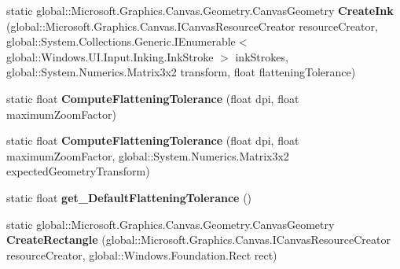 \begin{DoxyCompactItemize}
\item 
\mbox{\label{class_microsoft_1_1_graphics_1_1_canvas_1_1_geometry_1_1_canvas_geometry_a2ab66ac5c29e306f56d21b3368d42415}} 
static global\+::\+Microsoft.\+Graphics.\+Canvas.\+Geometry.\+Canvas\+Geometry {\bfseries Create\+Ink} (global\+::\+Microsoft.\+Graphics.\+Canvas.\+I\+Canvas\+Resource\+Creator resource\+Creator, global\+::\+System.\+Collections.\+Generic.\+I\+Enumerable$<$ global\+::\+Windows.\+U\+I.\+Input.\+Inking.\+Ink\+Stroke $>$ ink\+Strokes, global\+::\+System.\+Numerics.\+Matrix3x2 transform, float flattening\+Tolerance)
\item 
\mbox{\label{class_microsoft_1_1_graphics_1_1_canvas_1_1_geometry_1_1_canvas_geometry_af0a58e1e6450e34081143a65770bb043}} 
static float {\bfseries Compute\+Flattening\+Tolerance} (float dpi, float maximum\+Zoom\+Factor)
\item 
\mbox{\label{class_microsoft_1_1_graphics_1_1_canvas_1_1_geometry_1_1_canvas_geometry_a4cab7234385475a4109d2dcdca24ca39}} 
static float {\bfseries Compute\+Flattening\+Tolerance} (float dpi, float maximum\+Zoom\+Factor, global\+::\+System.\+Numerics.\+Matrix3x2 expected\+Geometry\+Transform)
\item 
\mbox{\label{class_microsoft_1_1_graphics_1_1_canvas_1_1_geometry_1_1_canvas_geometry_aec4a5123b972fd4576fdd3ab85f59718}} 
static float {\bfseries get\+\_\+\+Default\+Flattening\+Tolerance} ()
\item 
\mbox{\label{class_microsoft_1_1_graphics_1_1_canvas_1_1_geometry_1_1_canvas_geometry_a660756502ddaec1e43624023d23a5c60}} 
static global\+::\+Microsoft.\+Graphics.\+Canvas.\+Geometry.\+Canvas\+Geometry {\bfseries Create\+Rectangle} (global\+::\+Microsoft.\+Graphics.\+Canvas.\+I\+Canvas\+Resource\+Creator resource\+Creator, global\+::\+Windows.\+Foundation.\+Rect rect)
\item 
\mbox{\label{class_microsoft_1_1_graphics_1_1_canvas_1_1_geometry_1_1_canvas_geometry_a09f20f98661ef071c60ef36ee6e9c383}} 

\end{DoxyCompactItemize}
